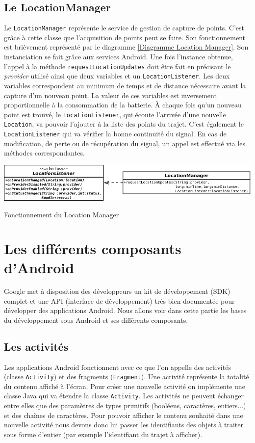 \subsection{Le LocationManager}
\label{locationManager}
Le \verb!LocationManager! représente le service de gestion de capture de points. C'est grâce à cette classe que l'acquisition de points peut se faire. Son fonctionnement est brièvement représenté par le diagramme \ref{Diagramme Location Manager}. Son instanciation se fait grâce aux services Android. Une fois l'instance obtenue, l'appel à la méthode \verb!requestLocationUpdates! doit être fait en précisant le \textit{provider} utilisé ainsi que deux variables et un \verb!LocationListener!. Les deux variables correspondent au minimum de temps et de distance nécessaire avant la capture d'un nouveau point. La valeur de ces variables est inversement proportionnelle à la consommation de la batterie. À chaque fois qu'un nouveau point est trouvé, le \verb!LocationListener!, qui écoute l'arrivée d'une nouvelle \verb!Location!, va pouvoir l'ajouter  à la liste des points du trajet. C'est également le \verb!LocationListener! qui va vérifier la bonne continuité du signal. En cas de modification, de perte ou de récupération du signal, un appel est effectué via les méthodes correspondantes.

\begin{img}  
	\includegraphics[scale=0.65]{img/LocationManager.png}
	\caption{Fonctionnement du Location Manager}
	\label{Diagramme Location Manager}
\end{img}

\section{Les différents composants d'Android}
Google met à disposition des développeurs un kit de développement (SDK) complet et une API (interface de développement) très bien documentée pour développer des applications Android. Nous allons voir dans cette partie les bases du développement sous Android et ses différents composants.
\subsection{Les activités}
Les applications Android fonctionnent avec ce que l'on appelle des activités (classe \verb!Activity!) et des fragments (\verb!Fragment!).
Une activité représente la totalité du contenu affiché à l'écran. Pour créer une nouvelle activité on implémente  une classe Java qui va étendre la classe \verb!Activity!. Les activités ne peuvent échanger entre elles que des paramètres de types primitifs (booléens, caractères, entiers...) et des chaînes de caractères. Pour pouvoir afficher le contenu souhaité dans une nouvelle activité nous devons donc lui passer les identifiants des objets à traiter sous forme d'entier (par exemple l'identifiant du trajet à afficher).\bigskip

